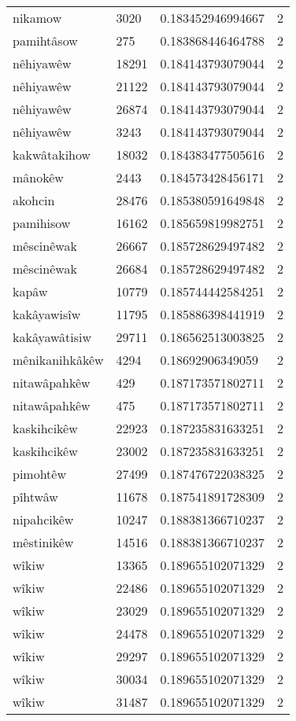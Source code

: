 \begin{longtable}{llll}
nikamow & 3020 & 0.183452946994667 & 2 \\
pamihtâsow & 275 & 0.183868446464788 & 2 \\
nêhiyawêw & 18291 & 0.184143793079044 & 2 \\
nêhiyawêw & 21122 & 0.184143793079044 & 2 \\
nêhiyawêw & 26874 & 0.184143793079044 & 2 \\
nêhiyawêw & 3243 & 0.184143793079044 & 2 \\
kakwâtakihow & 18032 & 0.184383477505616 & 2 \\
mânokêw & 2443 & 0.184573428456171 & 2 \\
akohcin & 28476 & 0.185380591649848 & 2 \\
pamihisow & 16162 & 0.185659819982751 & 2 \\
mêscinêwak & 26667 & 0.185728629497482 & 2 \\
mêscinêwak & 26684 & 0.185728629497482 & 2 \\
kapâw & 10779 & 0.185744442584251 & 2 \\
kakâyawisîw & 11795 & 0.185886398441919 & 2 \\
kakâyawâtisiw & 29711 & 0.186562513003825 & 2 \\
mênikanihkâkêw & 4294 & 0.18692906349059 & 2 \\
nitawâpahkêw & 429 & 0.187173571802711 & 2 \\
nitawâpahkêw & 475 & 0.187173571802711 & 2 \\
kaskihcikêw & 22923 & 0.187235831633251 & 2 \\
kaskihcikêw & 23002 & 0.187235831633251 & 2 \\
pimohtêw & 27499 & 0.187476722038325 & 2 \\
pîhtwâw & 11678 & 0.187541891728309 & 2 \\
nipahcikêw & 10247 & 0.188381366710237 & 2 \\
mêstinikêw & 14516 & 0.188381366710237 & 2 \\
wîkiw & 13365 & 0.189655102071329 & 2 \\
wîkiw & 22486 & 0.189655102071329 & 2 \\
wîkiw & 23029 & 0.189655102071329 & 2 \\
wîkiw & 24478 & 0.189655102071329 & 2 \\
wîkiw & 29297 & 0.189655102071329 & 2 \\
wîkiw & 30034 & 0.189655102071329 & 2 \\
wîkiw & 31487 & 0.189655102071329 & 2 \\

\end{longtable}
